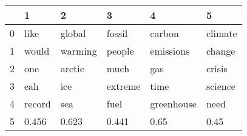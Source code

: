 \begin{tabular}{llllll}
\toprule
{} &       1 &        2 &        3 &           4 &        5 \\
\midrule
0 &    like &   global &   fossil &      carbon &  climate \\
1 &   would &  warming &   people &   emissions &   change \\
2 &     one &   arctic &     much &         gas &   crisis \\
3 &     eah &      ice &  extreme &        time &  science \\
4 &  record &      sea &     fuel &  greenhouse &     need \\
5 &   0.456 &    0.623 &    0.441 &        0.65 &     0.45 \\
\bottomrule
\end{tabular}
